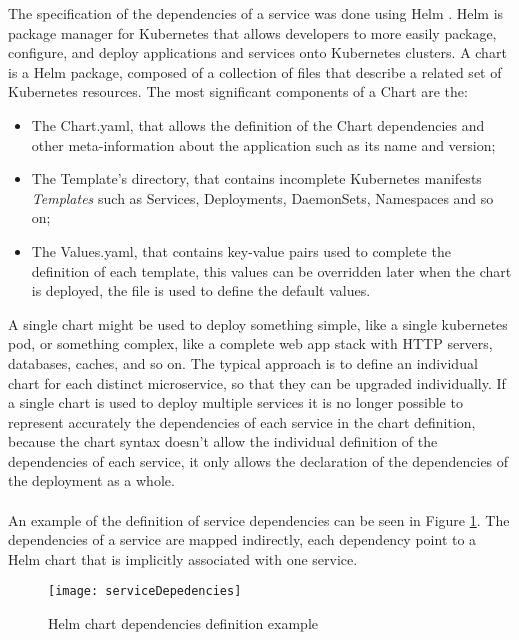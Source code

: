 The specification of the dependencies of a service was done using Helm \cite{helm}.
Helm is package manager for Kubernetes that allows developers to more easily package, configure, and deploy applications and services onto Kubernetes clusters.
A chart is a Helm package, composed of a collection of files that describe a related set of Kubernetes resources.
The most significant components of a Chart are the:
\begin{itemize}
    \item The Chart.yaml, that allows the definition of the Chart dependencies and other meta-information about the application such as its name and version;
    \item The Template's directory, that contains incomplete Kubernetes manifests \textit{Templates} such as Services, Deployments, DaemonSets, Namespaces and so on;
    \item The Values.yaml, that contains key-value pairs used to complete the definition of each template, this values can be overridden later when the chart is deployed, the file is used to define the default values.
\end{itemize}
A single chart might be used to deploy something simple, like a single kubernetes pod, or something complex, like a complete web app stack with HTTP servers, databases, caches, and so on.
The typical approach is to define an individual chart for each distinct microservice, so that they can be upgraded individually.
If a single chart is used to deploy multiple services it is no longer possible to represent accurately the dependencies of each service
in the chart definition, because the chart syntax doesn't allow the individual definition of the dependencies of each service, it only allows the declaration of the dependencies of the deployment as a whole.

\paragraph{}

An example of the definition of service dependencies can be seen in Figure \ref{fig:serviceDepedencies}.
The dependencies of a service are mapped indirectly, each dependency point to a Helm chart that is implicitly associated with one service.

\begin{figure}[htbp]
    \centering
    \texttt{[image: serviceDepedencies]}
    \caption{Helm chart dependencies definition example}
    \label{fig:serviceDepedencies}
\end{figure}

